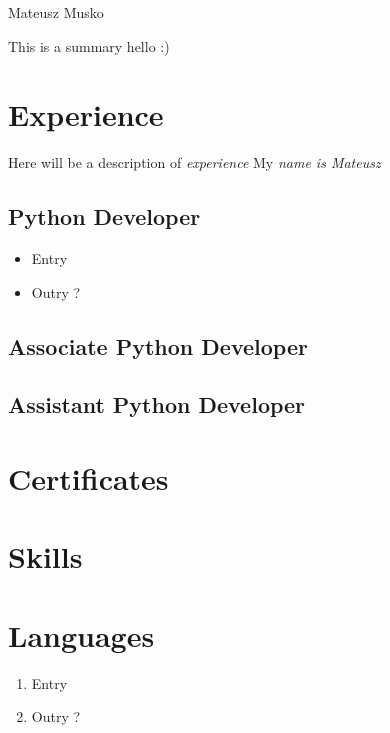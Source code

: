 \documentclass[a4paper, 12pt]{article} %
\begin{document}
Mateusz Musko

This is a summary hello :)

\section{Experience}
Here will be a description of \emph{experience} %
My \emph{name is \emph{Mateusz}} %

\subsection{Python Developer}
\begin{itemize} %
    \item Entry
    \item Outry ?
\end{itemize}
\subsection{Associate Python Developer}
\subsection{Assistant Python Developer}

\section{Certificates}

\section{Skills}

\section{Languages}
\begin{enumerate} %
    \item Entry
    \item Outry ?
\end{enumerate}
\end{document}
